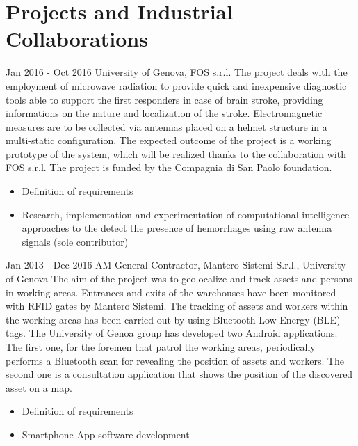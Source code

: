 \section{Projects and Industrial Collaborations}
{Jan 2016 - Oct 2016}
{University of Genova, FOS s.r.l.}
{ The project deals with the employment of microwave radiation to provide quick and inexpensive diagnostic tools able to support the first responders in case of brain stroke, providing informations on the nature and localization of the stroke. Electromagnetic measures are to be collected via antennas placed on a helmet structure in a multi-static configuration. The expected outcome of the project is a working prototype of the system, which will be realized thanks to the collaboration with FOS s.r.l.
The project is funded by the Compagnia di San Paolo foundation.
}

{
\begin{itemize}[noitemsep,topsep=0pt,parsep=0pt,partopsep=0pt]
\item Definition of requirements
\item Research, implementation and experimentation of computational intelligence approaches to the detect the presence of hemorrhages using raw antenna signals (sole contributor)
\end{itemize}
} 



{Jan 2013 - Dec 2016}
{AM General Contractor, Mantero Sistemi S.r.l., University of Genova}
{The aim of the project was to geolocalize and track assets and persons in working areas. Entrances and exits of the warehouses have been monitored with RFID gates by Mantero Sistemi. The tracking of assets and workers within the working areas has been carried out by using Bluetooth Low Energy (BLE) tags. The University of Genoa group has developed two Android applications. The first one, for the foremen that patrol the working areas, periodically performs a Bluetooth scan for revealing the position of assets and workers. The second one is a consultation application that shows the position of the discovered asset on a map.}
{
\begin{itemize}[noitemsep,topsep=0pt,parsep=0pt,partopsep=0pt]
\item Definition of requirements
\item Smartphone App software development
\end{itemize}
} 


